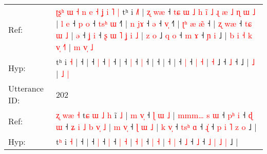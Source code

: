 \documentclass[10pt]{article}
\DeclareRobustCommand{\hl}[1]{{\textcolor{red}{#1}}}
\begin{document}
\begin{longtable}{ll}
Ref: & \hl{ʈ}\hl{ʂ}\hl{ʰ}\hl{ }\hl{ɯ}\hl{ }\hl{˧}\hl{ }\hl{n}\hl{ }\hl{e}\hl{ }\hl{˧}\hl{ }\hl{ʝ}\hl{ }\hl{i}\hl{ }\hl{˥}\hl{ }\hl{|}\hl{ }tʰ i \hl{˩}\hl{˥} |\hl{ }\hl{ʐ}\hl{ }\hl{w}\hl{æ} ˧\hl{ }\hl{t}\hl{ɕ}\hl{ }\hl{ɯ}\hl{ }\hl{˩}\hl{ }\hl{h}\hl{ }\hl{i}\hl{̃}\hl{ }\hl{˩}\hl{ }\hl{ɻ}\hl{ }\hl{æ}\hl{ }\hl{˩}\hl{ }\hl{ɳ}\hl{ }\hl{ɯ}\hl{ }\hl{˩} |\hl{ }\hl{l}\hl{ }\hl{e} ˧\hl{ }\hl{p} \hl{o} ˧\hl{ }\hl{t}\hl{s}\hl{ʰ} \hl{ɯ} ˧\hl{˥} |\hl{ }\hl{n}\hl{ }\hl{j}\hl{ɤ} ˧ \hl{ə} ˧ \hl{v}\hl{̩} ˧\hl{˥} |\hl{ }\hl{ʈ}\hl{ʰ}\hl{ }\hl{æ}\hl{ }\hl{æ}\hl{̃} ˧ |\hl{ }\hl{ʐ}\hl{ }\hl{w}\hl{æ} ˧\hl{ }\hl{t}\hl{ɕ}\hl{ }\hl{ɯ}\hl{ }\hl{˩} |\hl{ }\hl{ə} ˧\hl{ }\hl{ʝ} \hl{i} ˧\hl{ }\hl{ʂ}\hl{ }\hl{ɯ}\hl{ }\hl{˥}\hl{ }\hl{ʝ} \hl{i} \hl{˩} |\hl{ }\hl{z} \hl{o} ˩\hl{ }\hl{q}\hl{ }\hl{o} ˧\hl{ }\hl{m} \hl{ɤ} ˧\hl{ }\hl{ɲ}\hl{ }\hl{i} ˩ |\hl{ }\hl{b}\hl{ }\hl{i}\hl{ }\hl{˧}\hl{ }\hl{k}\hl{ }\hl{v}\hl{̩} \hl{˧}\hl{˥} |\hl{ }\hl{m} \hl{v}\hl{̩} \hl{˩}
 \\
Hyp: & \hl{}\hl{}\hl{}\hl{}\hl{}\hl{}\hl{}\hl{}\hl{}\hl{}\hl{}\hl{}\hl{}\hl{}\hl{}\hl{}\hl{}\hl{}\hl{}\hl{}\hl{}\hl{}tʰ i \hl{}\hl{˧} |\hl{}\hl{}\hl{}\hl{}\hl{} ˧\hl{}\hl{}\hl{}\hl{}\hl{}\hl{}\hl{}\hl{}\hl{}\hl{}\hl{}\hl{}\hl{}\hl{}\hl{}\hl{}\hl{}\hl{}\hl{}\hl{}\hl{}\hl{}\hl{}\hl{}\hl{}\hl{} |\hl{}\hl{}\hl{}\hl{} ˧\hl{}\hl{} \hl{|} ˧\hl{}\hl{}\hl{}\hl{} \hl{|} ˧\hl{} |\hl{}\hl{}\hl{}\hl{}\hl{} ˧ \hl{|} ˧ \hl{}\hl{|} ˧\hl{} |\hl{}\hl{}\hl{}\hl{}\hl{}\hl{}\hl{}\hl{} ˧ |\hl{}\hl{}\hl{}\hl{}\hl{} ˧\hl{}\hl{}\hl{}\hl{}\hl{}\hl{}\hl{} |\hl{}\hl{} ˧\hl{}\hl{} \hl{|} ˧\hl{}\hl{}\hl{}\hl{}\hl{}\hl{}\hl{}\hl{} \hl{|} \hl{˧} |\hl{}\hl{} \hl{˧} ˩\hl{}\hl{}\hl{}\hl{} ˧\hl{}\hl{} \hl{˩} ˧\hl{}\hl{}\hl{}\hl{} ˩ |\hl{}\hl{}\hl{}\hl{}\hl{}\hl{}\hl{}\hl{}\hl{}\hl{}\hl{} \hl{}\hl{˩} |\hl{}\hl{} \hl{}\hl{˩} \hl{|}
 \\
\midrule
Utterance ID: & 202 \\
Ref: & \hl{ʐ}\hl{ }\hl{w}\hl{æ}\hl{ }\hl{˧}\hl{ }t\hl{ɕ}\hl{ }\hl{ɯ}\hl{ }\hl{˩}\hl{ }\hl{h} i\hl{̃} \hl{˩} |\hl{ }\hl{m}\hl{ }\hl{v}\hl{̩} ˧\hl{ }\hl{ɭ}\hl{ }\hl{ɯ}\hl{ }\hl{˩} |\hl{ }\hl{m}\hl{m}\hl{m}\hl{…}\hl{ }\hl{s}\hl{ }\hl{ɯ} ˧\hl{ }\hl{p}\hl{ʰ} \hl{i} ˧\hl{ }\hl{ɖ} \hl{ɯ} ˧\hl{ }\hl{ʑ}\hl{ }\hl{i}\hl{ }\hl{˩}\hl{ }\hl{b} \hl{v}\hl{̩} \hl{˩} | \hl{m} \hl{v}\hl{̩} ˧\hl{ }\hl{ɭ} \hl{ɯ} \hl{˩} | \hl{k} \hl{v}\hl{̩} ˧\hl{ }\hl{t}\hl{s}\hl{ʰ} \hl{ɑ} ˧ \hl{ɻ}\hl{̍} ˧\hl{ }\hl{p} \hl{i} \hl{˥} \hl{z} \hl{o} ˩ |
 \\
Hyp: & \hl{}\hl{}\hl{}\hl{}\hl{}\hl{}\hl{}t\hl{}\hl{}\hl{}\hl{}\hl{}\hl{}\hl{ʰ} i\hl{} \hl{˧} |\hl{}\hl{}\hl{}\hl{}\hl{} ˧\hl{}\hl{}\hl{}\hl{}\hl{}\hl{} |\hl{}\hl{}\hl{}\hl{}\hl{}\hl{}\hl{}\hl{}\hl{} ˧\hl{}\hl{}\hl{} \hl{|} ˧\hl{}\hl{} \hl{|} ˧\hl{}\hl{}\hl{}\hl{}\hl{}\hl{}\hl{}\hl{} \hl{}\hl{|} \hl{˧} | \hl{˧} \hl{}\hl{|} ˧\hl{}\hl{} \hl{|} \hl{˧} | \hl{˧} \hl{}\hl{|} ˧\hl{}\hl{}\hl{}\hl{} \hl{˩} ˧ \hl{}\hl{˩} ˧\hl{}\hl{} \hl{˩} \hl{|} \hl{˩} \hl{|} ˩ |

\end{longtable}
\end{document}

